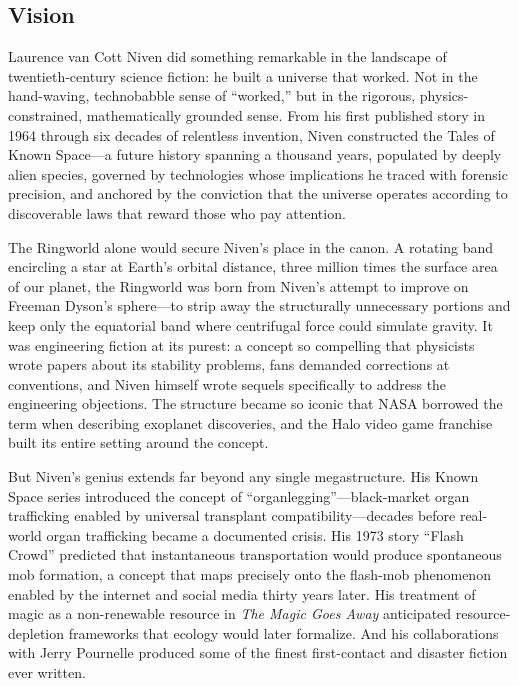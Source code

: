 \documentclass[11pt,letterpaper]{article}
\begin{document}
\subsection{Vision}

Laurence van Cott Niven did something remarkable in the landscape of twentieth-century science fiction: he built a universe that worked. Not in the hand-waving, technobabble sense of ``worked,'' but in the rigorous, physics-constrained, mathematically grounded sense. From his first published story in 1964 through six decades of relentless invention, Niven constructed the Tales of Known Space---a future history spanning a thousand years, populated by deeply alien species, governed by technologies whose implications he traced with forensic precision, and anchored by the conviction that the universe operates according to discoverable laws that reward those who pay attention.

The Ringworld alone would secure Niven's place in the canon. A rotating band encircling a star at Earth's orbital distance, three million times the surface area of our planet, the Ringworld was born from Niven's attempt to improve on Freeman Dyson's sphere---to strip away the structurally unnecessary portions and keep only the equatorial band where centrifugal force could simulate gravity. It was engineering fiction at its purest: a concept so compelling that physicists wrote papers about its stability problems, fans demanded corrections at conventions, and Niven himself wrote sequels specifically to address the engineering objections. The structure became so iconic that NASA borrowed the term when describing exoplanet discoveries, and the Halo video game franchise built its entire setting around the concept.

But Niven's genius extends far beyond any single megastructure. His Known Space series introduced the concept of ``organlegging''---black-market organ trafficking enabled by universal transplant compatibility---decades before real-world organ trafficking became a documented crisis. His 1973 story ``Flash Crowd'' predicted that instantaneous transportation would produce spontaneous mob formation, a concept that maps precisely onto the flash-mob phenomenon enabled by the internet and social media thirty years later. His treatment of magic as a non-renewable resource in \textit{The Magic Goes Away} anticipated resource-depletion frameworks that ecology would later formalize. And his collaborations with Jerry Pournelle produced some of the finest first-contact and disaster fiction ever written.
\end{document}
